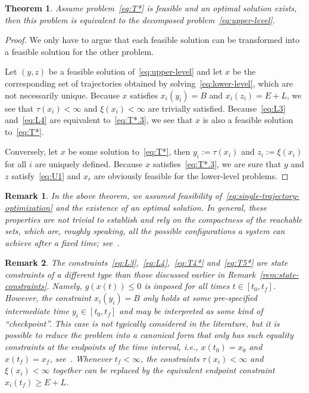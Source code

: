 \documentclass[a4paper]{report}
\theoremstyle{definition}
\theoremstyle{plain}
\newtheorem{theorem}{Theorem}[chapter]
\newtheorem*{remark}{Remark}
\begin{document}
\begin{theorem}
  Assume problem~\eqref{eq:T*} is feasible and an optimal solution exists, then this
  problem is equivalent to the decomposed problem~\eqref{eq:upper-level}.
\end{theorem}
\begin{proof}
  We only have to argue that each feasible solution can be transformed into a
  feasible solution for the other problem.

  Let $(y,z)$ be a feasible solution of~\eqref{eq:upper-level} and let $x$ be
  the corresponding set of trajectories obtained by
  solving~\eqref{eq:lower-level}, which are not necessarily unique. Because $x$
  satisfies $x_{i}(y_{i}) = B$ and $x_{i}(z_{i}) = E + L$, we see that
  $\tau(x_{i}) < \infty$ and $\xi(x_{i}) < \infty$ are trivially satisfied.
  Because~\eqref{eq:L3} and~\eqref{eq:L4} are equivalent to~\eqref{eq:T*.3}, we
  see that $x$ is also a feasible solution
  to~\eqref{eq:T*}.

  Conversely, let $x$ be some solution
  to~\eqref{eq:T*}, then
  $y_{i} := \tau(x_{i})$ and $z_{i} := \xi(x_{i})$ for all $i$ are uniquely
  defined. Because $x$ satisfies~\eqref{eq:T*.3}, we are sure that $y$ and $z$
  satisfy~\eqref{eq:U1} and $x_{r}$ are obviously feasible for the lower-level
  problems.
\end{proof}

\begin{remark}
  In the above theorem, we assumed feasibility of~\eqref{eq:single-trajectory-optimization} and the existence of an optimal solution.
  In general, these properties are not trivial to establish and rely on the
  compactness of the reachable sets, which are, roughly speaking, all the
  possible configurations a system can achieve after a fixed time;
  see~\cite[Section 4.5]{liberzonCalculusVariationsOptimal}.
\end{remark}


\begin{remark}
  The constraints~\eqref{eq:L3},~\eqref{eq:L4},~\eqref{eq:T4*}
  and~\eqref{eq:T5*} are state constraints of a different type than those
  discussed earlier in Remark~\ref{rem:state-constraints}. Namely,
  $g(x(t)) \leq 0$ is imposed for all times $t \in [t_{0}, t_{f}]$.
  However, the constraint $x_{i}(y_{i}) = B$ only holds at some pre-specified
  intermediate time $y_{i} \in [t_{0}, t_{f}]$ and may be interpreted as some
  kind of ``checkpoint''.
  This case is not typically considered in the literature, but it is
  possible to reduce the problem into a canonical form that only has such
  equality constraints at the endpoints of the time interval, i.e.,
  $x(t_{0}) = x_{0}$ and $x(t_{f}) = x_{f}$,
  see~\cite{dmitrukMaximumPrincipleOptimal2011}.
  Whenever $t_{f} < \infty$, the constraints $\tau(x_{i}) < \infty$ and
  $\xi(x_{i}) < \infty$ together can be replaced by the equivalent endpoint
  constraint $x_{i}(t_{f}) \geq E + L$.
\end{remark}
\end{document}
